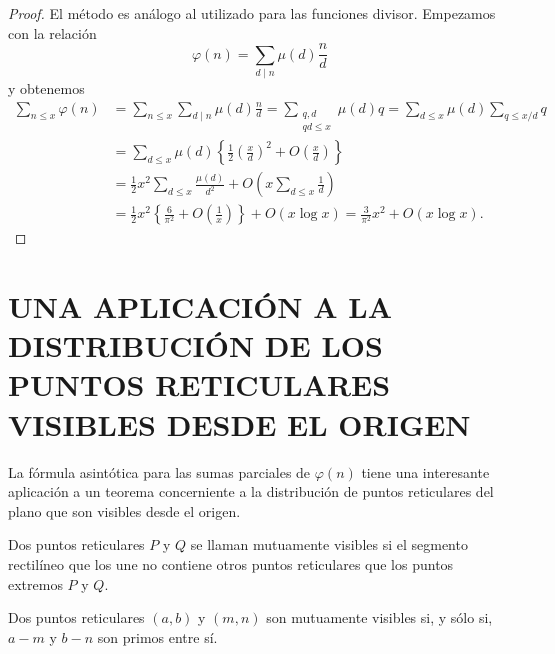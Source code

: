 \documentclass[12pt,a4paper]{book}
\begin{document}
    \begin{proof}
        El método es análogo al utilizado para las funciones divisor. Empezamos con la
        relación
        \begin{equation*}
            \varphi(n)=\sum_{d\mid n}\mu(d)\frac{n}{d}
        \end{equation*}
        y obtenemos
        \begin{align*}
            \sum_{n\leq x}\varphi(n)&=\sum_{n\leq x}\sum_{d\mid n}\mu(d)\frac{n}{d}
            =\sum_{\substack{q,d\\ qd\leq x}}\mu(d)q=\sum_{d\leq x}\mu(d)\sum_{q\leq x/d}q\\
            &=\sum_{d\leq x}\mu(d)\left\{\frac{1}{2}\left(\frac{x}{d}\right)^2+O\left(\frac{x}{d}\right)\right\}\\
            &=\frac{1}{2}x^2\sum_{d\leq x}\frac{\mu(d)}{d^2}+O\left(x\sum_{d\leq x}\frac{1}{d}\right)\\
            &=\frac{1}{2}x^2\left\{\frac{6}{\pi^2}+O\left(\frac{1}{x}\right)\right\}+O(x\log x)
            =\frac{3}{\pi^2}x^2+O(x\log x).
        \end{align*}
    \end{proof}

    \section{UNA APLICACIÓN A LA DISTRIBUCIÓN DE LOS PUNTOS RETICULARES VISIBLES DESDE EL
    ORIGEN}

    La fórmula asintótica para las sumas parciales de $\varphi(n)$ tiene una interesante
    aplicación a un teorema concerniente a la distribución de puntos reticulares del plano
    que son visibles desde el origen.

    \begin{definicion}
        Dos puntos reticulares $P$ y $Q$ se llaman mutuamente visibles si el segmento
        rectilíneo que los une no contiene otros puntos reticulares que los puntos
        extremos $P$ y $Q$.
    \end{definicion}

    \begin{teorema}
        Dos puntos reticulares $(a,b)$ y $(m,n)$ son mutuamente visibles si, y sólo si,
        $a-m$ y $b-n$ son primos entre sí.
    \end{teorema}
\end{document}

